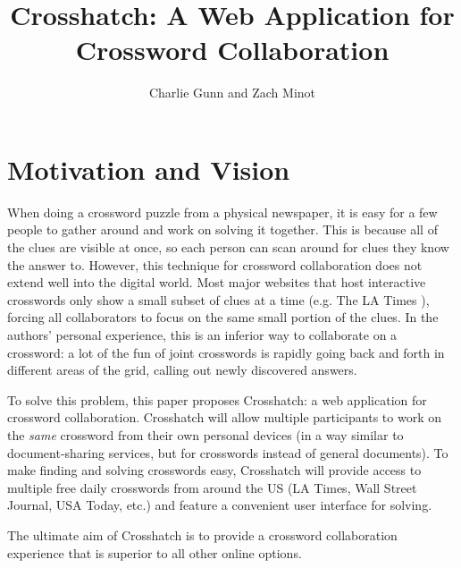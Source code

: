 \documentclass{article}
\author{Charlie Gunn and Zach Minot}
\title{Crosshatch: A Web Application for Crossword Collaboration}
\begin{document}
\maketitle

\section{Motivation and Vision}
\label{mot}
When doing a crossword puzzle from a physical newspaper, it is easy for a few people to gather around and work on solving it together.
This is because all of the clues are visible at once, so each person can scan around for clues they know the answer to. However, this technique
for crossword collaboration does not extend well into the digital world. Most major websites that host interactive crosswords only show a small subset of
clues at a time (e.g. The LA Times \cite{latcrossword}), forcing all collaborators to focus on the same small portion of the clues. In the authors' personal experience,
this is an inferior way to collaborate on a crossword: a lot of the fun of joint crosswords is rapidly going back and forth in different areas
of the grid, calling out newly discovered answers.

To solve this problem, this paper proposes Crosshatch: a web application for crossword collaboration. Crosshatch will
allow multiple participants to work on the \textit{same} crossword from their own personal devices (in a way similar to document-sharing services,
but for crosswords instead of general documents). To make finding and solving crosswords easy, Crosshatch will provide access to multiple free daily crosswords
from around the US (LA Times, Wall Street Journal, USA Today, etc.) and feature a convenient user interface for solving.

The ultimate aim of Crosshatch is to provide a crossword collaboration experience that is superior to all other online options.
\newpage
\end{document}
